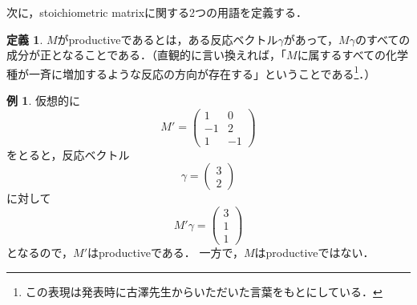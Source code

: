 \documentclass[a4paper,11pt]{jsarticle}
\theoremstyle{definition}
\newtheorem{dfn}{定義}
\newtheorem{ex}{例}
\begin{document}
次に，stoichiometric matrixに関する2つの用語を定義する．
\begin{dfn}
  $M$がproductiveであるとは，ある反応ベクトル$\gamma$があって，$M\gamma$のすべての成分が正となることである．（直観的に言い換えれば，「$M$に属するすべての化学種が一斉に増加するような反応の方向が存在する」ということである\footnote{この表現は発表時に古澤先生からいただいた言葉をもとにしている．}．）
\end{dfn}
\begin{ex}
  仮想的に
\begin{equation}
  M' = \left(
    \begin{matrix}
      1 & 0 \\
      -1 & 2 \\
      1 & -1
    \end{matrix}
  \right)
\end{equation}
をとると，反応ベクトル
\begin{equation}
  \gamma = \left(
    \begin{matrix}
      3 \\
      2
    \end{matrix}
  \right)
\end{equation}
に対して
\begin{equation}
  M'\gamma = \left(
    \begin{matrix}
      3 \\
      1 \\
      1
    \end{matrix}
  \right)
\end{equation}
となるので，$M'$はproductiveである．
一方で，$M$はproductiveではない．
\end{ex}
\end{document}
